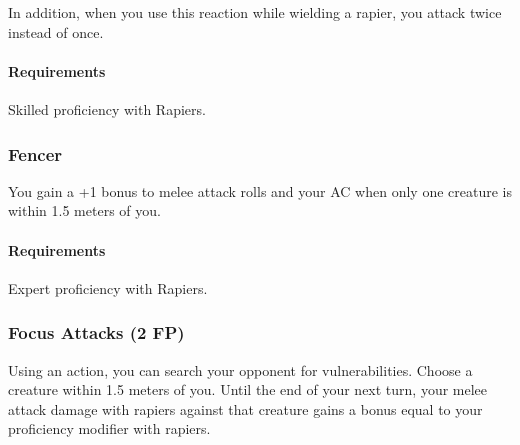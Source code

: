     In addition, when you use this reaction while wielding a rapier, you attack twice instead of once.
    \paragraph{Requirements} Skilled proficiency with Rapiers.
\subsubsection{Fencer} \label{feat::fencer}
    You gain a +1 bonus to melee attack rolls and your AC when only one creature is within 1.5 meters of you.
    \paragraph{Requirements} Expert proficiency with Rapiers.
\subsubsection{Focus Attacks (2 FP)} \label{feat::focusattacks}
    Using an action, you can search your opponent for vulnerabilities.
    Choose a creature within 1.5 meters of you.
    Until the end of your next turn, your melee attack damage with rapiers against that creature gains a bonus equal to your proficiency modifier with rapiers.
